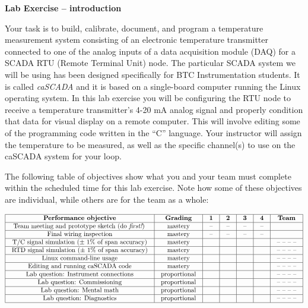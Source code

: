 \begin{itemize}
\noindent
{\bf Lab Exercise -- introduction}

\vskip 5pt

Your task is to build, calibrate, document, and program a temperature measurement system consisting of an electronic temperature transmitter connected to one of the analog inputs of a data acquisition module (DAQ) for a SCADA RTU (Remote Terminal Unit) node.  The particular SCADA system we will be using has been designed specifically for BTC Instrumentation students.  It is called {\sl caSCADA} and it is based on a single-board computer running the Linux operating system.  In this lab exercise you will be configuring the RTU node to receive a temperature transmitter's 4-20 mA analog signal and properly condition that data for visual display on a remote computer.  This will involve editing some of the programming code written in the ``C'' language.  Your instructor will assign the temperature to be measured, as well as the specific channel(s) to use on the caSCADA system for your loop.

The following table of objectives show what you and your team must complete within the scheduled time for this lab exercise.  Note how some of these objectives are individual, while others are for the team as a whole:



$$\vbox{\offinterlineskip
\halign{\strut
\vrule \quad\hfil # \ \hfil & 
\vrule \quad\hfil # \ \hfil & 
\vrule \quad\hfil # \ \hfil & 
\vrule \quad\hfil # \ \hfil & 
\vrule \quad\hfil # \ \hfil & 
\vrule \quad\hfil # \ \hfil & 
\vrule \quad\hfil # \ \hfil \vrule \cr
\noalign{\hrule}
%
{\bf Performance objective} & {\bf Grading} & {\bf 1} & {\bf 2} & {\bf 3} & {\bf 4} & {\bf Team} \cr
%
\noalign{\hrule}
%
Team meeting and prototype sketch (do {\it first!}) & mastery & -- & -- & -- & -- & \cr
%
\noalign{\hrule}
%
Final wiring inspection & mastery & -- & -- & -- & -- &  \cr
%
\noalign{\hrule}
%
T/C signal simulation ($\pm$ 1\% of span accuracy) & mastery &  &  &  &  & -- -- -- -- \cr
%
\noalign{\hrule}
%
RTD signal simulation ($\pm$ 1\% of span accuracy) & mastery &  &  &  &  & -- -- -- -- \cr
%
\noalign{\hrule}
%
Linux command-line usage & mastery &  &  &  &  & -- -- -- -- \cr
%
\noalign{\hrule}
%
Editing and running caSCADA code & mastery &  &  &  &  & -- -- -- -- \cr
%
\noalign{\hrule}
%
Lab question: Instrument connections & proportional &  &  &  &  & -- -- -- -- \cr
%
\noalign{\hrule}
%
Lab question: Commissioning & proportional &  &  &  &  & -- -- -- -- \cr
%
\noalign{\hrule}
%
Lab question: Mental math & proportional &  &  &  &  & -- -- -- -- \cr
%
\noalign{\hrule}
%
Lab question: Diagnostics & proportional &  &  &  &  & -- -- -- -- \cr
%
\noalign{\hrule}
} %
}$$ %


\end{itemize}
